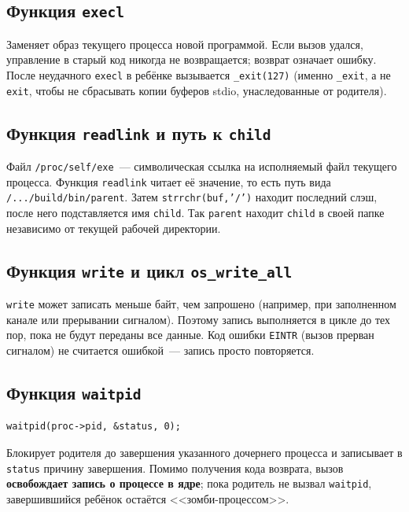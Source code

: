 \documentclass[11pt, a4paper]{article}
\begin{document}
\subsection{Функция \texttt{execl}}

Заменяет образ текущего процесса новой программой. Если вызов удался,
управление в старый код никогда не возвращается; возврат означает ошибку.
После неудачного \texttt{execl} в ребёнке вызывается \texttt{\_\allowbreak{}exit(127)}
(именно \texttt{\_\allowbreak{}exit}, а не \texttt{exit}, чтобы не сбрасывать копии
буферов stdio, унаследованные от родителя).

\subsection{Функция \texttt{readlink} и путь к \texttt{child}}

Файл \texttt{/\allowbreak{}proc/\allowbreak{}self/\allowbreak{}exe}~--- символическая ссылка на исполняемый файл
текущего процесса. Функция \texttt{readlink} читает её значение, то есть путь
вида \texttt{/\allowbreak{}.../\allowbreak{}build/\allowbreak{}bin/\allowbreak{}parent}. Затем \texttt{strrchr(buf,'/\allowbreak{}')} находит
последний слэш, после него подставляется имя \texttt{child}. Так
\texttt{parent} находит \texttt{child} в своей папке независимо от
текущей рабочей директории.

\subsection{Функция \texttt{write} и цикл \texttt{os\_write\_all}}

\texttt{write} может записать меньше байт, чем запрошено (например, при
заполненном канале или прерывании сигналом). Поэтому запись выполняется в
цикле до тех пор, пока не будут переданы все данные. Код ошибки
\texttt{EINTR} (вызов прерван сигналом) не считается ошибкой~--- запись
просто повторяется.

\subsection{Функция \texttt{waitpid}}

\begin{lstlisting}
waitpid(proc->pid, &status, 0);
\end{lstlisting}

Блокирует родителя до завершения указанного дочернего процесса и
записывает в \texttt{status} причину завершения. Помимо получения кода
возврата, вызов \textbf{освобождает запись о процессе в ядре}; пока
родитель не вызвал \texttt{waitpid}, завершившийся ребёнок остаётся
<<зомби-процессом>>.
\end{document}
